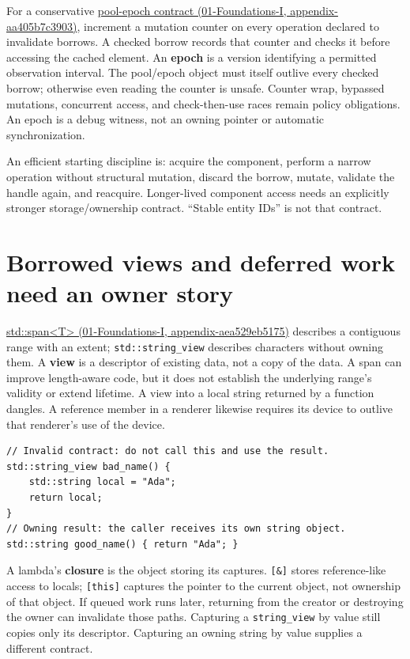For a conservative \href{../01-Foundations-I/main.pdf\#nameddest=appendix-aa405b7c3903}{pool-epoch contract (01-Foundations-I, appendix-aa405b7c3903)}, increment a mutation counter on every operation declared to invalidate borrows. A checked borrow records that counter and checks it before accessing the cached element. An \textbf{epoch} is a version identifying a permitted observation interval. The pool/epoch object must itself outlive every checked borrow; otherwise even reading the counter is unsafe. Counter wrap, bypassed mutations, concurrent access, and check-then-use races remain policy obligations. An epoch is a debug witness, not an owning pointer or automatic synchronization.

An efficient starting discipline is: acquire the component, perform a narrow operation without structural mutation, discard the borrow, mutate, validate the handle again, and reacquire. Longer-lived component access needs an explicitly stronger storage/ownership contract. ``Stable entity IDs'' is not that contract.

\section{Borrowed views and deferred work need an owner story}\label{05-engine-i-ch003-borrowed-views-and-deferred-work-need-an-owner-story}

\href{../01-Foundations-I/main.pdf\#nameddest=appendix-aea529eb5175}{std::span\textless T\textgreater{} (01-Foundations-I, appendix-aea529eb5175)} describes a contiguous range with an extent; \texttt{std::string\_view} describes characters without owning them. A \textbf{view} is a descriptor of existing data, not a copy of the data. A span can improve length-aware code, but it does not establish the underlying range's validity or extend lifetime. A view into a local string returned by a function dangles. A reference member in a renderer likewise requires its device to outlive that renderer's use of the device.

\begin{verbatim}
// Invalid contract: do not call this and use the result.
std::string_view bad_name() {
    std::string local = "Ada";
    return local;
}
// Owning result: the caller receives its own string object.
std::string good_name() { return "Ada"; }
\end{verbatim}

A lambda's \textbf{closure} is the object storing its captures. \texttt{{[}\&{]}} stores reference-like access to locals; \texttt{{[}this{]}} captures the pointer to the current object, not ownership of that object. If queued work runs later, returning from the creator or destroying the owner can invalidate those paths. Capturing a \texttt{string\_view} by value still copies only its descriptor. Capturing an owning string by value supplies a different contract.

